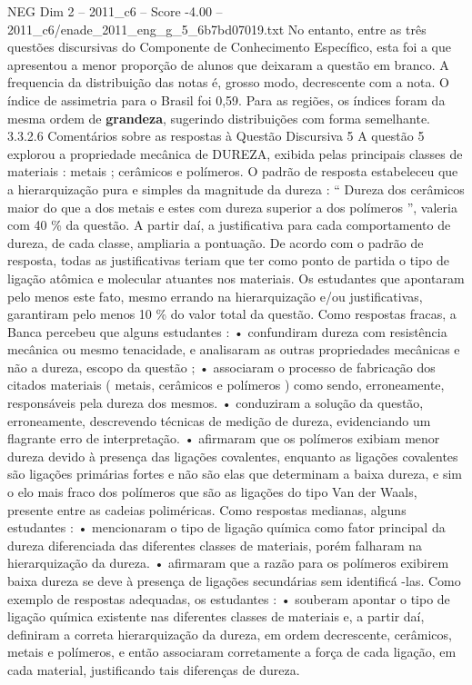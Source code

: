 \begin{textsample}{NEG Dim 2 – 2011\_c6 – Score -4.00 – 2011\_c6/enade\_2011\_eng\_g\_5\_6b7bd07019.txt}
No entanto, entre as três questões discursivas do Componente de Conhecimento Específico, esta foi a que apresentou a menor proporção de alunos que deixaram a questão em branco.
A frequencia da distribuição das notas é, grosso modo, decrescente com a nota.
O índice de assimetria para o Brasil foi 0,59.
Para as regiões, os índices foram da mesma ordem de \textbf{grandeza}, sugerindo distribuições com forma semelhante. 3.3.2.6 Comentários sobre as respostas à Questão Discursiva 5 A questão 5 explorou a propriedade mecânica de DUREZA, exibida pelas principais classes de materiais : metais ; cerâmicos e polímeros.
O padrão de resposta estabeleceu que a hierarquização pura e simples da magnitude da dureza : “ Dureza dos cerâmicos maior do que a dos metais e estes com dureza superior a dos polímeros ”, valeria com 40 \% da questão.
A partir daí, a justificativa para cada comportamento de dureza, de cada classe, ampliaria a pontuação.
De acordo com o padrão de resposta, todas as justificativas teriam que ter como ponto de partida o tipo de ligação atômica e molecular atuantes nos materiais.
Os estudantes que apontaram pelo menos este fato, mesmo errando na hierarquização e/ou justificativas, garantiram pelo menos 10 \% do valor total da questão.
Como respostas fracas, a Banca percebeu que alguns estudantes : • confundiram dureza com resistência mecânica ou mesmo tenacidade, e analisaram as outras propriedades mecânicas e não a dureza, escopo da questão ; • associaram o processo de fabricação dos citados materiais ( metais, cerâmicos e polímeros ) como sendo, erroneamente, responsáveis pela dureza dos mesmos. • conduziram a solução da questão, erroneamente, descrevendo técnicas de medição de dureza, evidenciando um flagrante erro de interpretação. • afirmaram que os polímeros exibiam menor dureza devido à presença das ligações covalentes, enquanto as ligações covalentes são ligações primárias fortes e não são elas que determinam a baixa dureza, e sim o elo mais fraco dos polímeros que são as ligações do tipo Van der Waals, presente entre as cadeias poliméricas.
Como respostas medianas, alguns estudantes : • mencionaram o tipo de ligação química como fator principal da dureza diferenciada das diferentes classes de materiais, porém falharam na hierarquização da dureza. • afirmaram que a razão para os polímeros exibirem baixa dureza se deve à presença de ligações secundárias sem identificá -las.
Como exemplo de respostas adequadas, os estudantes : • souberam apontar o tipo de ligação química existente nas diferentes classes de materiais e, a partir daí, definiram a correta hierarquização da dureza, em ordem decrescente, cerâmicos, metais e polímeros, e então associaram corretamente a força de cada ligação, em cada material, justificando tais diferenças de dureza.

\end{textsample}
